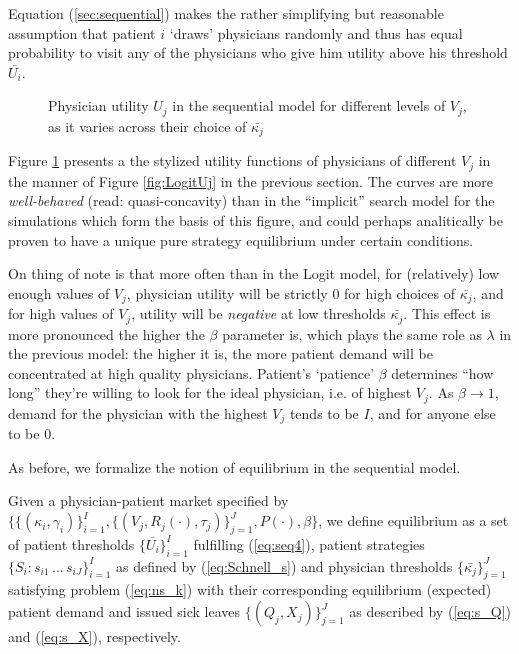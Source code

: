 \documentclass[../main.tex]{subfiles}
\begin{document}
Equation (\ref{sec:sequential}) makes the rather simplifying but reasonable assumption that patient $i$ `draws' physicians randomly and thus has equal probability to visit any of the physicians who give him utility above his threshold $\bar{U_i}$.

\vspace{-3.8em}

\begin{figure}[H]
    \centering
    \begin{tikzpicture}[scale=0.6]
    
    \end{tikzpicture}
    \caption{Physician utility $U_j$ in the sequential model for different levels of $V_j$,\\ as it varies across their choice of $\bar{\kappa_j}$}
    \label{fig:SchnellUj}
\end{figure}

Figure \ref{fig:SchnellUj} presents a the stylized utility functions of physicians of different $V_j$ in the manner of Figure \ref{fig:LogitUj} in the previous section. The curves are more \textit{well-behaved} (read: quasi-concavity) than in the ``implicit'' search model for the simulations which form the basis of this figure, and could perhaps analitically be proven to have a unique pure strategy equilibrium under certain conditions.

On thing of note is that more often than in the Logit model, for (relatively) low enough values of $V_j$, physician utility will be strictly 0 for high choices of $\bar{\kappa_j}$, and for high values of $V_j$, utility will be \textit{negative} at low thresholds $\bar{\kappa_j}$. This effect is more pronounced the higher the $\beta$ parameter is, which plays the same role as $\lambda$ in the previous model: the higher it is, the more patient demand will be concentrated at high quality physicians. Patient's `patience' $\beta$ determines ``how long'' they're willing to look for the ideal physician, i.e. of highest $V_j$. As $\beta \rightarrow 1$, demand for the physician with the highest $V_j$ tends to be $I$, and for anyone else to be 0.

As before, we formalize the notion of equilibrium in the sequential model.

\vspace{0.5em}
\begin{equilibrium}
    \label{Logit_eq}
Given a physician-patient market specified by $\{\{(\kappa_i,\gamma_i)\}_{i =1}^{I},\{(V_j, R_j(\cdot), \tau_j)\}_{j =1}^{J}, P(\cdot), \beta \}$, we define equilibrium as a set of patient thresholds $\{\bar{U_i}\}_{i =1}^{I}$ fulfilling (\ref{eq:seq4}), patient strategies $\{S_i: s_{i1} \, ... \, s_{iJ}\}_{i =1}^{I}$ as defined by (\ref{eq:Schnell_s}) and physician thresholds $\{\bar{\kappa_j}\}_{j =1}^{J}$ satisfying problem (\ref{eq:ns_k}) with their corresponding equilibrium (expected) patient demand and issued sick leaves $\{(Q_j,X_j)\}_{j =1}^{J}$ as described by (\ref{eq:s_Q}) and (\ref{eq:s_X}), respectively.
\end{equilibrium}
\end{document}
